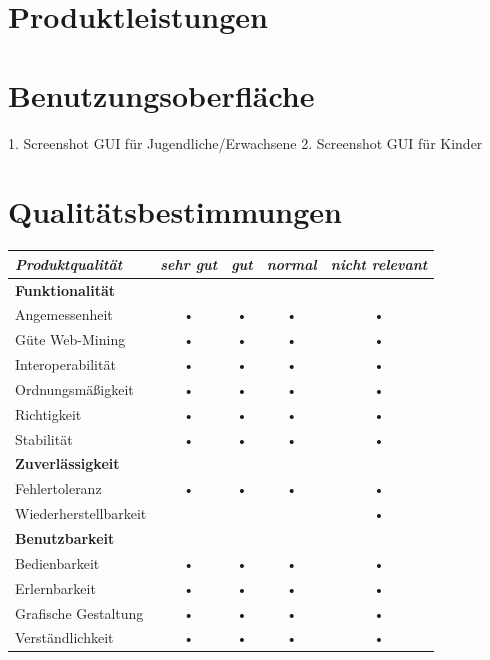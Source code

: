 \documentclass[10pt]{report}
\begin{document}
\chapter{Produktleistungen}

\chapter{Benutzungsoberfläche}
1. Screenshot GUI für Jugendliche/Erwachsene
2. Screenshot GUI für Kinder

\chapter{Qualitätsbestimmungen}
\begin{center}
\begin{tabular}{lcccc}
\hline 
\rule[-1ex]{0pt}{4ex} \textit{Produktqualität} & \textit{sehr gut} & \textit{gut} & \textit{normal} & \textit{nicht relevant} \\ 
\hline 
\rule[-1ex]{0pt}{4ex} \textbf{Funktionalität} &  &  &  &  \\ 
\rule[-1ex]{0pt}{4ex} \hspace{10pt} Angemessenheit & • & • & • & • \\ 
\rule[-1ex]{0pt}{4ex} \hspace{10pt} Güte Web-Mining & • & • & • & • \\ 
\rule[-1ex]{0pt}{4ex} \hspace{10pt} Interoperabilität & • & • & • & • \\ 
\rule[-1ex]{0pt}{4ex} \hspace{10pt} Ordnungsmäßigkeit & • & • & • & • \\ 
\rule[-1ex]{0pt}{4ex} \hspace{10pt} Richtigkeit & • & • & • & • \\ 
\rule[-1ex]{0pt}{4ex} \hspace{10pt} Stabilität & • & • & • & • \\ 

\hline 
\rule[-1ex]{0pt}{4ex} \textbf{Zuverlässigkeit} &  &  &  &  \\ 
\rule[-1ex]{0pt}{4ex} \hspace{10pt} Fehlertoleranz & • & • & • & • \\ 
\rule[-1ex]{0pt}{4ex} \hspace{10pt} Wiederherstellbarkeit &  &  &  & • \\ 

\hline 
\rule[-1ex]{0pt}{4ex} \textbf{Benutzbarkeit} &  &  &  &  \\ 
\rule[-1ex]{0pt}{4ex} \hspace{10pt} Bedienbarkeit & • & • & • & • \\ 
\rule[-1ex]{0pt}{4ex} \hspace{10pt} Erlernbarkeit & • & • & • & • \\ 
\rule[-1ex]{0pt}{4ex} \hspace{10pt} Grafische Gestaltung & • & • & • & • \\ 
\rule[-1ex]{0pt}{4ex} \hspace{10pt} Verständlichkeit & • & • & • & • \\ 


\end{tabular}
\end{center}
\end{document}
